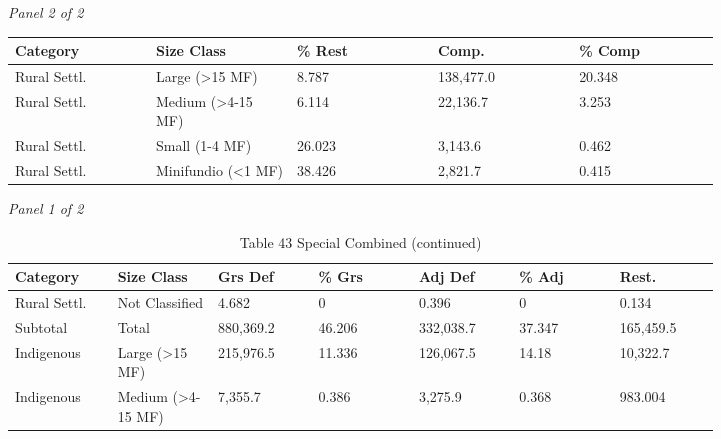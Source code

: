 \documentclass[12pt]{article}
\begin{document}
\begin{landscape}
\begin{table}[H]
\textit{Panel 2 of 2}\\[2pt]
{\fontsize{12}{14}\selectfont
\setlength{\tabcolsep}{3pt}
\renewcommand{\arraystretch}{1.08}
\begin{tabular}{p{0.164\linewidth}p{0.164\linewidth}p{0.164\linewidth}p{0.164\linewidth}p{0.164\linewidth}}
\toprule
Category & Size Class & \% Rest & Comp. & \% Comp \\
\midrule
Rural Settl. & Large (>15 MF) & 8.787 & 138,477.0 & 20.348 \\
Rural Settl. & Medium (>4-15 MF) & 6.114 & 22,136.7 & 3.253 \\
Rural Settl. & Small (1-4 MF) & 26.023 & 3,143.6 & 0.462 \\
Rural Settl. & Minifundio (<1 MF) & 38.426 & 2,821.7 & 0.415 \\
\bottomrule
\end{tabular}
}
\end{table}
\begin{table}[H]
\centering
\caption{Table 43 Special Combined (continued)}
\textit{Panel 1 of 2}\\[2pt]
{\fontsize{12}{14}\selectfont
\setlength{\tabcolsep}{3pt}
\renewcommand{\arraystretch}{1.08}
\begin{tabular}{p{0.117\linewidth}p{0.117\linewidth}p{0.117\linewidth}p{0.117\linewidth}p{0.117\linewidth}p{0.117\linewidth}p{0.117\linewidth}}
\toprule
Category & Size Class & Grs Def & \% Grs & Adj Def & \% Adj & Rest. \\
\midrule
Rural Settl. & Not Classified & 4.682 & 0 & 0.396 & 0 & 0.134 \\
Subtotal & Total & 880,369.2 & 46.206 & 332,038.7 & 37.347 & 165,459.5 \\
Indigenous & Large (>15 MF) & 215,976.5 & 11.336 & 126,067.5 & 14.18 & 10,322.7 \\
Indigenous & Medium (>4-15 MF) & 7,355.7 & 0.386 & 3,275.9 & 0.368 & 983.004 \\
\bottomrule
\end{tabular}
}

\vspace{0.6em}


\end{table}
\end{landscape}
\end{document}
